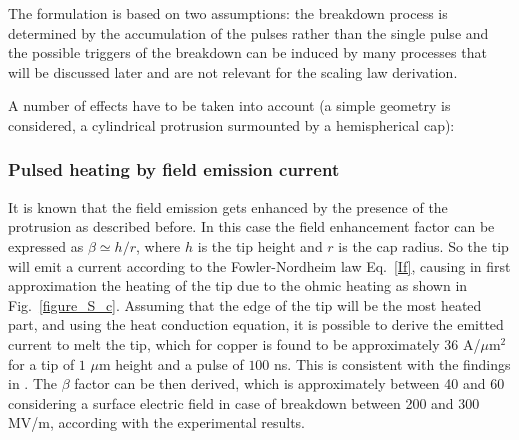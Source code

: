 The formulation is based on two assumptions: the breakdown process is determined by the accumulation of the pulses rather than the single pulse and the possible triggers of the breakdown can be induced by many processes that will be discussed later and are not relevant for the scaling law derivation.

A number of effects have to be taken into account (a simple geometry is considered, a cylindrical protrusion surmounted by a hemispherical  cap): 

\subsubsection{Pulsed heating by field emission current}

It is known that the field emission gets enhanced by the presence of the protrusion as described before. In this case the field enhancement factor can be expressed as $\beta \simeq h/r$, where $h$ is the tip height and $r$ is the cap radius. So the tip will emit a current according to the Fowler-Nordheim law Eq.~\ref{If}, causing in first approximation the heating of the tip due to the ohmic heating as shown in Fig.~\ref{figure_S_c}. Assuming that the edge of the tip will be the most heated part, and using the heat conduction equation, it is possible to derive the emitted current to melt the tip, which for copper is found to be approximately $36$ A/$\mu$m$^2$ for a tip of $1$  $\mu$m height and a pulse of $100$ ns. This is consistent with the findings in \cite{soviet:1983}. The $\beta$ factor can be then derived, which is approximately between 40 and 60 considering a surface electric field in case of breakdown between 200 and $300$ MV/m, according with the experimental results.

